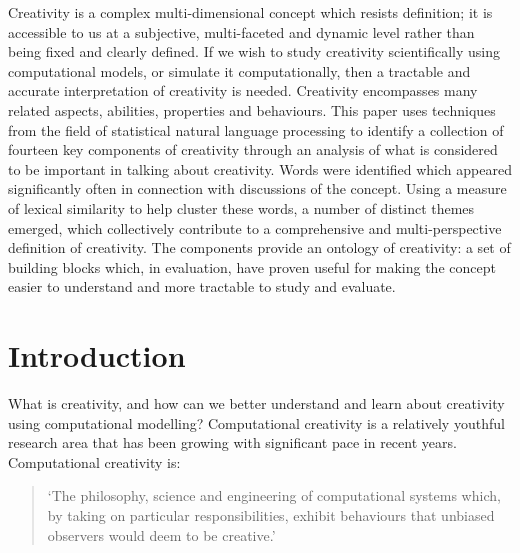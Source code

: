 \documentclass[10pt,letterpaper]{article}
\begin{document}
Creativity is a complex multi-dimensional concept which resists definition; it is accessible to us at a subjective, multi-faceted and dynamic level rather than being fixed and clearly defined. If we wish to study creativity scientifically using computational models, or simulate it computationally, then a tractable and accurate interpretation of creativity is needed. Creativity encompasses many related aspects, abilities, properties and behaviours. This paper uses techniques from the field of statistical natural language processing to identify a collection of fourteen key components of creativity through an analysis of what is considered to be important in talking about creativity. Words were identified which appeared significantly often in connection with discussions of the concept. Using a measure of lexical similarity to help cluster these words, a number of distinct themes emerged, which collectively contribute to a comprehensive and multi-perspective definition of creativity. The components provide an ontology of creativity: a set of building blocks which, in evaluation, have proven useful for making the concept easier to understand and more tractable to study and evaluate.



\linenumbers

\section*{Introduction}\label{intro}


What is creativity, and how can we better understand and learn about creativity using computational modelling? Computational creativity is a relatively youthful research area that has been growing with significant pace in recent years. Computational creativity is: 
\begin{quote}`The philosophy, science and engineering of computational systems which, by taking on particular responsibilities, exhibit behaviours that unbiased observers would deem to be creative.' 
\cite[p. 21]{coltonwiggins12}
\end{quote}
\end{document}
